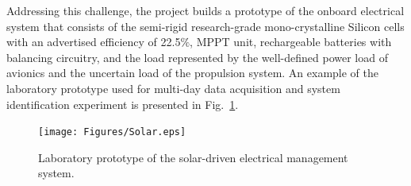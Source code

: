\documentclass{ifacconf}
\begin{document}
%

Addressing this challenge, the project builds a prototype of the onboard
electrical system that consists of the semi-rigid research-grade mono-crystalline
Silicon cells with an advertised efficiency of 22.5$\%$, MPPT unit,
rechargeable batteries with balancing circuitry, and the load represented by
the well-defined power load of avionics and the uncertain load of the
propulsion system. An example of the laboratory prototype used for multi-day
data acquisition and system identification experiment is presented in
Fig.~\ref{fig:Solar_arch}.

\begin{figure}[thpb]
  \centering
  \texttt{[image: Figures/Solar.eps]}
  \caption{Laboratory prototype of the solar-driven electrical management system.}
  \label{fig:Solar_arch}
\end{figure}
\end{document}
